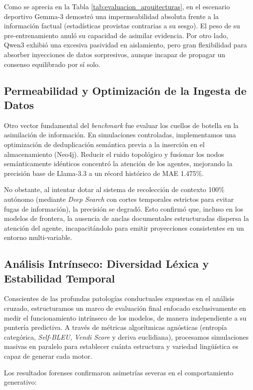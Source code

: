 ﻿\documentclass{article}
\begin{document}
Como se aprecia en la Tabla \ref{tab:evaluacion_arquitecturas}, en el escenario deportivo Gemma-3 demostró una impermeabilidad absoluta frente a la información factual (estadísticas provistas contrarias a su sesgo). El peso de su pre-entrenamiento anuló su capacidad de asimilar evidencia. Por otro lado, Qwen3 exhibió una excesiva pasividad en aislamiento, pero gran flexibilidad para absorber inyecciones de datos sorpresivos, aunque incapaz de propagar un consenso equilibrado por sí solo.

\subsection{Permeabilidad y Optimización de la Ingesta de Datos}

Otro vector fundamental del \textit{benchmark} fue evaluar los cuellos de botella en la asimilación de información. En simulaciones controladas, implementamos una optimización de deduplicación semántica previa a la inserción en el almacenamiento (Neo4j). Reducir el ruido topológico y fusionar los nodos semánticamente idénticos concentró la atención de los agentes, mejorando la precisión base de Llama-3.3 a un récord histórico de MAE 1.475\%.

No obstante, al intentar dotar al sistema de recolección de contexto 100\% autónomo (mediante \textit{Deep Search} con cortes temporales estrictos para evitar fugas de información), la precisión se degradó. Esto confirmó que, incluso en los modelos de frontera, la ausencia de anclas documentales estructuradas dispersa la atención del agente, incapacitándolo para emitir proyecciones consistentes en un entorno multi-variable.

\subsection{Análisis Intrínseco: Diversidad Léxica y Estabilidad Temporal}

Conscientes de las profundas patologías conductuales expuestas en el análisis cruzado, estructuramos un marco de evaluación final enfocado exclusivamente en medir el funcionamiento intrínseco de los modelos, de manera independiente a su puntería predictiva. A través de métricas algorítmicas agnósticas (entropía categórica, \textit{Self-BLEU}, \textit{Vendi Score} y deriva euclidiana), procesamos simulaciones masivas en paralelo para establecer cuánta estructura y variedad lingüística es capaz de generar cada motor.

Los resultados forenses confirmaron asimetrías severas en el comportamiento generativo:
\end{document}
